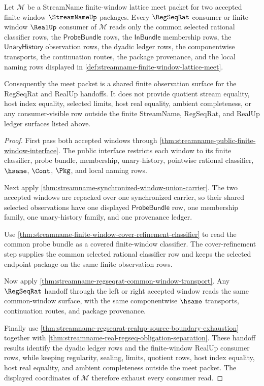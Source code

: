 \begin{theorem}
\label{thm:streamname-finite-window-lattice-meet-exhaustion}
Let $\mathcal M$ be a StreamName finite-window lattice meet packet for two
accepted finite-window $\StreamNameUp$ packages. Every $\RegSeqRat$ consumer
or finite-window $\RealUp$ consumer of $\mathcal M$ reads only the common
selected rational classifier rows, the $\mathsf{ProbeBundle}$ rows, the
$\mathsf{InBundle}$ membership rows, the $\mathsf{UnaryHistory}$ observation
rows, the dyadic ledger rows, the componentwise transports, the continuation
routes, the package provenance, and the local naming rows displayed in
\autoref{def:streamname-finite-window-lattice-meet}.

Consequently the meet packet is a shared finite observation surface for the
RegSeqRat and RealUp handoffs. It does not provide quotient stream equality,
host index equality, selected limits, host real equality, ambient
completeness, or any consumer-visible row outside the finite StreamName,
RegSeqRat, and RealUp ledger surfaces listed above.
\end{theorem}
\begin{proof}
First pass both accepted windows through
\autoref{thm:streamname-public-finite-window-interface}. The public interface
restricts each window to its finite classifier, probe bundle, membership,
unary-history, pointwise rational classifier, $\hsame$, $\Cont$, $\Pkg$, and
local naming rows.

Next apply \autoref{thm:streamname-synchronized-window-union-carrier}. The
two accepted windows are repacked over one synchronized carrier, so their
shared selected observations have one displayed $\mathsf{ProbeBundle}$ row,
one membership family, one unary-history family, and one provenance ledger.

Use \autoref{thm:streamname-finite-window-cover-refinement-classifier} to
read the common probe bundle as a covered finite-window classifier. The
cover-refinement step supplies the common selected rational classifier row
and keeps the selected endpoint package on the same finite observation rows.

Now apply \autoref{thm:streamname-regseqrat-common-window-transport}. Any
$\RegSeqRat$ handoff through the left or right accepted window reads the same
common-window surface, with the same componentwise $\hsame$ transports,
continuation routes, and package provenance.

Finally use
\autoref{thm:streamname-regseqrat-realup-source-boundary-exhaustion} together
with \autoref{thm:streamname-real-regseq-obligation-separation}. These
handoff results identify the dyadic ledger rows and the finite-window RealUp
consumer rows, while keeping regularity, sealing, limits, quotient rows, host
index equality, host real equality, and ambient completeness outside the meet
packet. The displayed coordinates of $\mathcal M$ therefore exhaust every
consumer read.
\end{proof}

